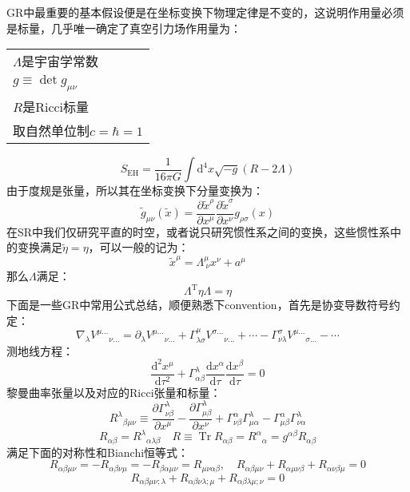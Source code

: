 GR中最重要的基本假设便是在坐标变换下物理定律是不变的，这说明作用量必须是标量，几乎唯一确定了真空引力场作用量为：
\begin{margintable}\footnotesize 
	\begin{tabularx}{\marginparwidth}{|X}
		$\Lambda$是宇宙学常数\\
		$g\equiv\det g_{\mu\nu}$\\
		$R$是Ricci标量\\
		取自然单位制$c=\hbar=1$
	\end{tabularx}
\end{margintable}
\begin{equation}
	S_{\mathrm{EH}}=\frac{1}{16\pi G}\int \mathrm{d}^4x\sqrt{-g} (R-2\Lambda)
\end{equation}
由于度规是张量，所以其在坐标变换下分量变换为：
\[\tilde{g}_{\mu\nu}(\tilde{x})=\frac{\partial \tilde{x}^\rho}{\partial x^\mu}\frac{\partial \tilde{x}^\sigma}{\partial x^\nu}g_{\rho\sigma}(x)\]
在SR中我们仅研究平直的时空，或者说只研究惯性系之间的变换，这些惯性系中的变换满足$\tilde{\eta}=\eta$，可以一般的记为：
\[\tilde{x}^\mu=\Lambda^{\mu}_{\ \nu}x^\nu+a^\mu\]
那么$\Lambda$满足：
\begin{equation}
	\Lambda^{\operatorname{T}}\eta\Lambda=\eta
\end{equation}
下面是一些GR中常用公式总结，顺便熟悉下convention，首先是协变导数符号约定：
\[\nabla_\lambda {V^{\mu\ldots}}_{\nu\ldots}=\partial_\lambda {V^{\mu\ldots}}_{\nu\ldots}+\Gamma_{\lambda\sigma}^{\mu}{V^{\sigma\ldots}}_{\nu\ldots}+\cdots-\Gamma_{\nu\lambda}^{\sigma}{V^{\mu\ldots}}_{\sigma\ldots}-\cdots\]
测地线方程：
\[
	\boxed{\frac{\mathrm{d}^2x^\mu}{\mathrm{d}\tau^2}+\Gamma_{\alpha\beta}^\lambda\frac{\mathrm{d}x^\alpha}{\mathrm{d}\tau}\frac{\mathrm{d}x^\beta}{\mathrm{d}\tau}=0}
\]
黎曼曲率张量以及对应的Ricci张量和标量：
\[
R^{\lambda}{}_{\beta\mu\nu}\equiv\frac{\partial\Gamma_{\nu\beta}^{\lambda}}{\partial x^{\mu}}-\frac{\partial\Gamma_{\mu\beta}^{\lambda}}{\partial x^{\nu}}+\Gamma_{\nu\beta}^{\alpha}\Gamma_{\mu\alpha}^{\lambda}-\Gamma_{\mu\beta}^{\alpha}\Gamma_{\nu\alpha}^{\lambda}
\]
\[
R_{\alpha\beta}=R^{\lambda}{}_{\alpha\lambda\beta}\quad R\equiv\operatorname{Tr}R_{\alpha\beta}=R^{\alpha}{}_{\alpha}=g^{\alpha\beta}R_{\alpha\beta}
\]
满足下面的对称性和Bianchi恒等式：
\[
R_{\alpha\beta\mu\nu}=-R_{\alpha\beta\nu\mu}=-R_{\beta\alpha\mu\nu}=R_{\mu\nu\alpha\beta},\quad R_{\alpha\beta\mu\nu}+R_{\alpha\mu\nu\beta}+R_{\alpha\nu\beta\mu}=0
\]
\[
R_{\alpha\beta\mu\nu;\lambda}+R_{\alpha\beta\nu\lambda;\mu}+R_{\alpha\beta\lambda\mu;\nu}=0
\]
